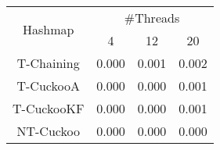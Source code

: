 \begin{tabular}{|c|c|c|c|}
\hline
\multirow{2}{*}{Hashmap} & \multicolumn{3}{c|}{\#Threads}\\\cline{2-4}& 4 & 12 & 20\\
\hline
\hline
T-Chaining & 0.000 & 0.001 & 0.002\\
T-CuckooA & 0.000 & 0.000 & 0.001\\
T-CuckooKF & 0.000 & 0.000 & 0.001\\
NT-Cuckoo & 0.000 & 0.000 & 0.000\\
\hline
\end{tabular}
